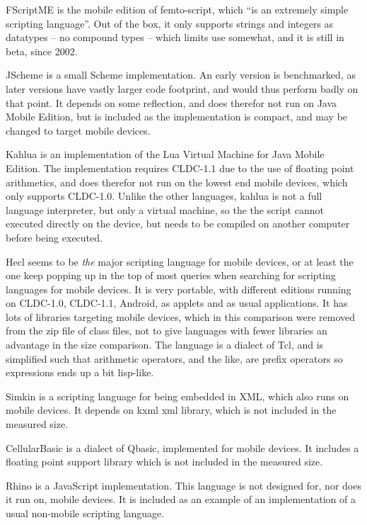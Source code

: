 \documentclass[11pt]{report}
\begin{document}
FScriptME\cite{fscriptme} is the mobile edition of femto-script, which ``is an extremely simple scripting language''\cite{fscript}. 
Out of the box, it only supports strings and integers as datatypes -- no compound types -- which limits use somewhat, and it is still in beta, since 2002. 

JScheme\cite{jscheme} is a small Scheme implementation. An early version is benchmarked, as later versions have vastly larger code footprint, and would thus perform badly on that point. It depends on some reflection, and does therefor not run on Java Mobile Edition, but is included as the implementation is compact, and may be changed to target mobile devices.

Kahlua\cite{kahlua} is an implementation of the Lua Virtual Machine for Java Mobile Edition. 
The implementation requires CLDC-1.1 due to the use of floating point arithmetics, and does therefor not run on the lowest end mobile devices, which only supports CLDC-1.0.
Unlike the other languages, kahlua is not a full language interpreter, but only a virtual machine, so the the script cannot executed directly on the device, but needs to be compiled on another computer before being executed.

Hecl\cite{hecl} seems to be \emph{the} major scripting language for mobile devices, or at least the one keep popping up in the top of most queries when searching for scripting languages for mobile devices.
It is very portable, with different editions running on CLDC-1.0, CLDC-1.1, Android, as applets and as usual applications.
It has lots of libraries targeting mobile devices, which in this comparison were removed from the zip file of class files, not to give languages with fewer libraries an advantage in the size comparison.
The language is a dialect of Tcl, and is simplified such that arithmetic operators, and the like, are prefix operators so expressions ends up a bit lisp-like.

Simkin\cite{simkin} is a scripting language for being embedded in XML, which also runs on mobile devices. It depends on kxml xml library, which is not included in the measured size. 

CellularBasic\cite{cellularbasic} is a dialect of Qbasic, implemented for mobile devices. 
It includes a floating point support library which is not included in the measured size. 

Rhino\cite{rhino} is a JavaScript implementation. This language is not designed for, nor does it run on, mobile devices. It is included as an example of an implementation of a usual non-mobile scripting language.
\end{document}
